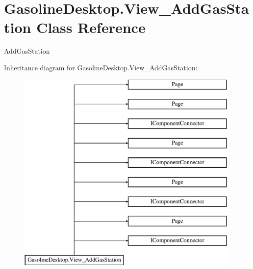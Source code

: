 \hypertarget{class_gasoline_desktop_1_1_view___add_gas_station}{}\section{Gasoline\+Desktop.\+View\+\_\+\+Add\+Gas\+Station Class Reference}
\label{class_gasoline_desktop_1_1_view___add_gas_station}


Add\+Gas\+Station  


Inheritance diagram for Gasoline\+Desktop.\+View\+\_\+\+Add\+Gas\+Station\+:\begin{figure}[H]
\begin{center}
\leavevmode
\includegraphics[height=10.000000cm]{class_gasoline_desktop_1_1_view___add_gas_station}
\end{center}
\end{figure}
